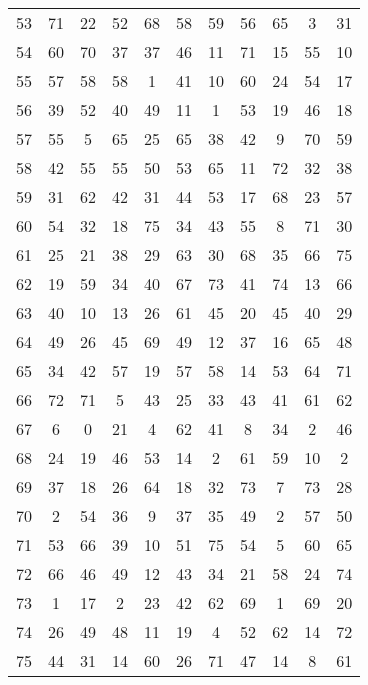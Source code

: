 \begin{table}
\begin{tabular}{c c c c c c c c c c c }
53 & 71 & 22 & 52 & 68 & 58 & 59 & 56 & 65 & 3 & 31 \\
54 & 60 & 70 & 37 & 37 & 46 & 11 & 71 & 15 & 55 & 10 \\
55 & 57 & 58 & 58 & 1 & 41 & 10 & 60 & 24 & 54 & 17 \\
56 & 39 & 52 & 40 & 49 & 11 & 1 & 53 & 19 & 46 & 18 \\
57 & 55 & 5 & 65 & 25 & 65 & 38 & 42 & 9 & 70 & 59 \\
58 & 42 & 55 & 55 & 50 & 53 & 65 & 11 & 72 & 32 & 38 \\
59 & 31 & 62 & 42 & 31 & 44 & 53 & 17 & 68 & 23 & 57 \\
60 & 54 & 32 & 18 & 75 & 34 & 43 & 55 & 8 & 71 & 30 \\
61 & 25 & 21 & 38 & 29 & 63 & 30 & 68 & 35 & 66 & 75 \\
62 & 19 & 59 & 34 & 40 & 67 & 73 & 41 & 74 & 13 & 66 \\
63 & 40 & 10 & 13 & 26 & 61 & 45 & 20 & 45 & 40 & 29 \\
64 & 49 & 26 & 45 & 69 & 49 & 12 & 37 & 16 & 65 & 48 \\
65 & 34 & 42 & 57 & 19 & 57 & 58 & 14 & 53 & 64 & 71 \\
66 & 72 & 71 & 5 & 43 & 25 & 33 & 43 & 41 & 61 & 62 \\
67 & 6 & 0 & 21 & 4 & 62 & 41 & 8 & 34 & 2 & 46 \\
68 & 24 & 19 & 46 & 53 & 14 & 2 & 61 & 59 & 10 & 2 \\
69 & 37 & 18 & 26 & 64 & 18 & 32 & 73 & 7 & 73 & 28 \\
70 & 2 & 54 & 36 & 9 & 37 & 35 & 49 & 2 & 57 & 50 \\
71 & 53 & 66 & 39 & 10 & 51 & 75 & 54 & 5 & 60 & 65 \\
72 & 66 & 46 & 49 & 12 & 43 & 34 & 21 & 58 & 24 & 74 \\
73 & 1 & 17 & 2 & 23 & 42 & 62 & 69 & 1 & 69 & 20 \\
74 & 26 & 49 & 48 & 11 & 19 & 4 & 52 & 62 & 14 & 72 \\
75 & 44 & 31 & 14 & 60 & 26 & 71 & 47 & 14 & 8 & 61 \\
\hline
\end{tabular}
\end{table}